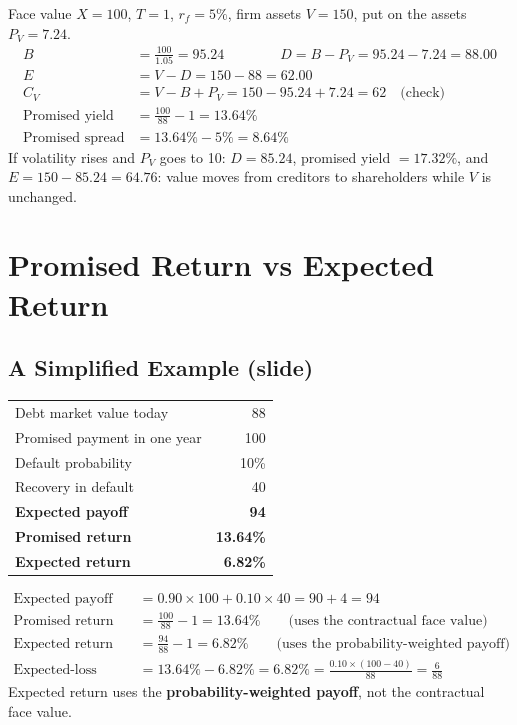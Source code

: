 \begin{exbox}
Face value $X=100$, $T=1$, $r_f=5\%$, firm assets $V=150$, put on the assets $P_V=7.24$.
\begin{align*}
B&=\frac{100}{1.05}=95.24 \qquad\qquad D=B-P_V=95.24-7.24=\mathbf{88.00}\\
E&=V-D=150-88=\mathbf{62.00}\\
C_V&=V-B+P_V=150-95.24+7.24=62\quad\text{(check)}\\
\text{Promised yield}&=\frac{100}{88}-1=13.64\%\\
\text{Promised spread}&=13.64\%-5\%=8.64\%
\end{align*}
If volatility rises and $P_V$ goes to 10: $D=85.24$, promised yield $=17.32\%$, and $E=150-85.24=64.76$: value moves from creditors to shareholders while $V$ is unchanged.
\end{exbox}

\section{Promised Return vs Expected Return}

\subsection{A Simplified Example (slide)}
\begin{exbox}
\begin{center}
\begin{tabular}{@{}lr@{}}
\toprule
Debt market value today & 88\\
Promised payment in one year & 100\\
Default probability & 10\%\\
Recovery in default & 40\\
\midrule
\textbf{Expected payoff} & \textcolor{keyred}{\textbf{94}}\\
\textbf{Promised return} & \textcolor{keyred}{\textbf{13.64\%}}\\
\textbf{Expected return} & \textcolor{keyred}{\textbf{6.82\%}}\\
\bottomrule
\end{tabular}
\end{center}
\begin{align*}
\text{Expected payoff}&=0.90\times100+0.10\times40=90+4=94\\
\text{Promised return}&=\frac{100}{88}-1=13.64\%\qquad\text{(uses the contractual face value)}\\
\text{Expected return}&=\frac{94}{88}-1=6.82\%\qquad\text{(uses the probability-weighted payoff)}\\
\text{Expected-loss yield}&=13.64\%-6.82\%=6.82\%=\frac{0.10\times(100-40)}{88}=\frac{6}{88}
\end{align*}
Expected return uses the \textbf{probability-weighted payoff}, not the contractual face value.
\end{exbox}

